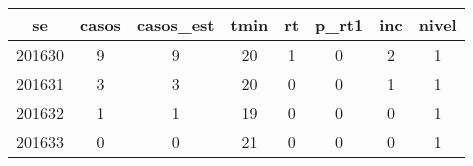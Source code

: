 \begin{tabular}{c|ccccccc}
  \hline
se & casos & casos\_est & tmin & rt & p\_rt1 & inc & nivel \\ 
  \hline
201630 & 9 & 9 & 20 & 1 & 0 & 2 & 1 \\ 
  201631 & 3 & 3 & 20 & 0 & 0 & 1 & 1 \\ 
  201632 & 1 & 1 & 19 & 0 & 0 & 0 & 1 \\ 
  201633 & 0 & 0 & 21 & 0 & 0 & 0 & 1 \\ 
   \hline
\end{tabular}
